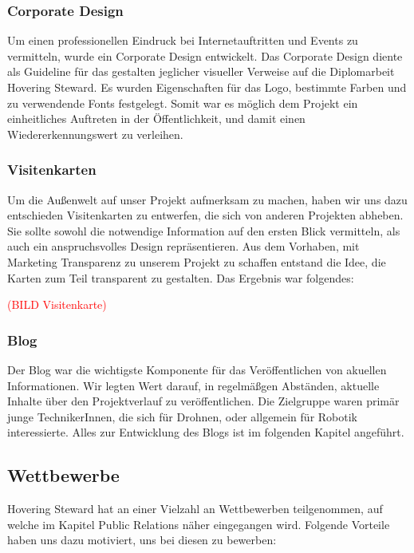     \subsubsection{Corporate Design}
    Um einen professionellen Eindruck bei Internetauftritten und Events zu vermitteln, wurde ein Corporate Design entwickelt.
    Das Corporate Design diente als Guideline für das gestalten jeglicher visueller Verweise auf die Diplomarbeit Hovering Steward.
    Es wurden Eigenschaften für das Logo, bestimmte Farben und zu verwendende Fonts festgelegt.
    Somit war es möglich dem Projekt ein einheitliches Auftreten in der Öffentlichkeit, und damit einen Wiedererkennungswert zu verleihen.

    \subsubsection{Visitenkarten}
    Um die Außenwelt auf unser Projekt aufmerksam zu machen, haben wir uns dazu entschieden Visitenkarten zu entwerfen, die sich von anderen Projekten abheben.
    Sie sollte sowohl die notwendige Information auf den ersten Blick vermitteln, als auch ein anspruchsvolles Design repräsentieren. Aus dem Vorhaben,
    mit Marketing Transparenz zu unserem Projekt zu schaffen entstand die Idee, die Karten zum Teil transparent zu gestalten.
    Das Ergebnis war folgendes:

    \textcolor{red}{(BILD Visitenkarte)}

    \subsubsection{Blog}
    Der Blog war die wichtigste Komponente für das Veröffentlichen von akuellen Informationen. Wir legten Wert darauf,
    in regelmäßgen Abständen, aktuelle Inhalte über den Projektverlauf zu veröffentlichen. Die Zielgruppe waren primär junge TechnikerInnen,
    die sich für Drohnen, oder allgemein für Robotik interessierte. Alles zur Entwicklung des Blogs ist im folgenden Kapitel angeführt.

    \subsection{Wettbewerbe}
    Hovering Steward hat an einer Vielzahl an Wettbewerben teilgenommen, auf welche im Kapitel Public Relations näher eingegangen wird.
    Folgende Vorteile haben uns dazu motiviert, uns bei diesen zu bewerben:

